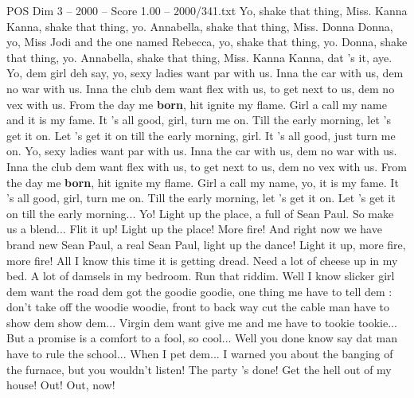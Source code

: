 \begin{textsample}{POS Dim 3 – 2000 – Score 1.00 – 2000/341.txt}
Yo, shake that thing, Miss.
Kanna Kanna, shake that thing, yo.
Annabella, shake that thing, Miss.
Donna Donna, yo, Miss Jodi and the one named Rebecca, yo, shake that thing, yo.
Donna, shake that thing, yo.
Annabella, shake that thing, Miss.
Kanna Kanna, dat 's it, aye.
Yo, dem girl deh say, yo, sexy ladies want par with us.
Inna the car with us, dem no war with us.
Inna the club dem want flex with us, to get next to us, dem no vex with us.
From the day me \textbf{born}, hit ignite my flame.
Girl a call my name and it is my fame.
It 's all good, girl, turn me on.
Till the early morning, let 's get it on.
Let 's get it on till the early morning, girl.
It 's all good, just turn me on.
Yo, sexy ladies want par with us.
Inna the car with us, dem no war with us.
Inna the club dem want flex with us, to get next to us, dem no vex with us.
From the day me \textbf{born}, hit ignite my flame.
Girl a call my name, yo, it is my fame.
It 's all good, girl, turn me on.
Till the early morning, let 's get it on.
Let 's get it on till the early morning...
Yo!
Light up the place, a full of Sean Paul.
So make us a blend...
Flit it up!
Light up the place!
More fire!
And right now we have brand new Sean Paul, a real Sean Paul, light up the dance!
Light it up, more fire, more fire!
All I know this time it is getting dread.
Need a lot of cheese up in my bed.
A lot of damsels in my bedroom.
Run that riddim.
Well I know slicker girl dem want the road dem got the goodie goodie, one thing me have to tell dem : don't take off the woodie woodie, front to back way cut the cable man have to show dem show dem...
Virgin dem want give me and me have to tookie tookie...
But a promise is a comfort to a fool, so cool...
Well you done know say dat man have to rule the school...
When I pet dem...
I warned you about the banging of the furnace, but you wouldn't listen!
The party 's done!
Get the hell out of my house!
Out!
Out, now!

\end{textsample}
